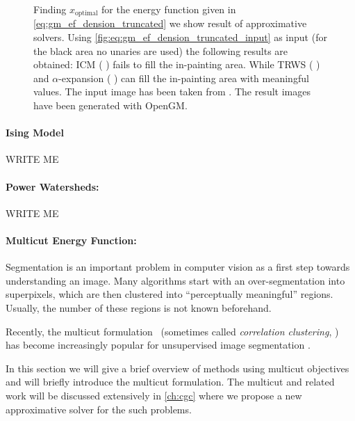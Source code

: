 \begin{figure}[H]
{    }
    \caption[Energy based truncated denoising]{
        Finding $x_{\text{optimal}} $ for the energy function given
        in \cref{eq:gm_ef_dension_truncated} we show result of approximative solvers.
        Using \cref{fig:eq:gm_ef_dension_truncated_input} as input (for the black area no unaries 
        are used)
        the following
        results are obtained: ICM \citep{besag_1986_icm}  ( ) fails
        to fill the in-painting area. While TRWS \cite{kolmogorov_2006_pami_trws}  ( ) 
        and $\alpha$-expansion \cite{boykov_2001_pami}  ( ) can fill the in-painting area
        with meaningful values.
        The input image has been taken from \citep{szeliski_2008_pami}.
        The result images have been generated with OpenGM.
    }\label{fig:gm_ef_dension_truncated}
\end{figure}


\paragraph{Ising Model}
    WRITE ME

\paragraph{Power Watersheds:}
    WRITE ME

\paragraph{Multicut Energy Function:}


Segmentation is an important problem in computer vision as a first step
towards understanding an image. Many algorithms start with an over-segmentation
into superpixels, which are then clustered into ``perceptually meaningful''
regions.
Usually, the number of these regions is not known beforehand.

Recently, the multicut formulation~\cite{chopra_1993_mp} 
(sometimes called \emph{correlation clustering}, \cite{bansal_2004_ml}) 
has become increasingly popular for unsupervised
image segmentation \cite{andres_2011_iccv,yarkony_2012_eccv,alush_2013_simbad}.

In this section we will give a brief overview of methods using multicut objectives
and will briefly introduce the multicut formulation.
The multicut and related work will be discussed extensively in \cref{ch:cgc} where
we propose a new approximative solver for the such problems.



